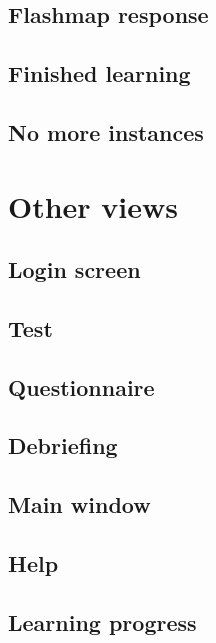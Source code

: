 \subsection{Flashmap response}

\subsection{Finished learning}

\subsection{No more instances}

\section{Other views}

\subsection{Login screen}

\subsection{Test}

\subsection{Questionnaire}

\subsection{Debriefing}

\subsection{Main window}

\subsection{Help}

\subsection{Learning progress}
\label{sec:learningprogress}

